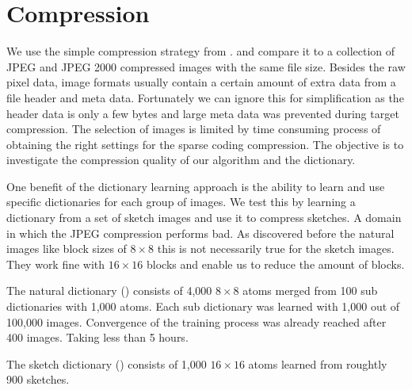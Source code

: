 
\clearpage
\section{Compression}
We use the simple compression strategy from .
and compare it to a collection of JPEG and JPEG 2000 compressed images with the
same file size. Besides the raw pixel data, image formats usually contain a
certain amount of extra data from a file header and meta data. Fortunately we
can ignore this for simplification as the header data is only a few bytes and
large meta data was prevented during target compression. The selection of
images is limited by time consuming process of obtaining the right settings
for the sparse coding compression. 
The objective is to investigate the compression quality of our algorithm and
the dictionary. 

One benefit of the dictionary learning approach is the ability to learn and
use specific dictionaries for each group of images. We test this by learning a
dictionary from a set of sketch images and use it to compress sketches. A domain
in which the JPEG compression performs bad. As discovered before the natural
images like block sizes of $8\times 8$ this is not necessarily true for the
sketch images. They work fine with $16\times 16$ blocks and enable us to reduce
the amount of blocks.

The natural dictionary () consists of 4,000 $8 \times
8$ atoms merged from 100 sub dictionaries with 1,000 atoms. Each sub
dictionary was learned with 1,000 out of 100,000 images. Convergence of the
training process was already reached after 400 images. Taking less than 5
hours.

The sketch dictionary () consists of 1,000
$16\times 16$ atoms learned from roughtly 900 sketches.


